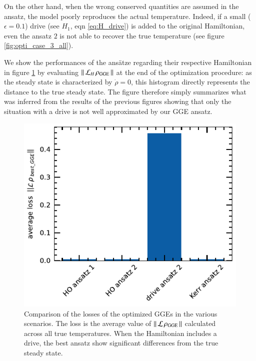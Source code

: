 On the other hand, when the wrong conserved quantities are assumed in the ansatz, the model poorly reproduces the actual temperature. 
Indeed, if a small ($\epsilon = 0.1$) drive (see $H_1$, eqn \ref{eq:H_drive}) is added to the original Hamiltonian, even the ansatz $2$ is not able to recover the true temperature (see figure \ref{fig:opti_case_3_all}).


We show the performances of the ansätze regarding their respective Hamiltonian in figure \ref{fig:comp_avg_loss} by evaluating $\vert\vert\, \mathcal{L}_H \, \rho_{\rm GGE} \,\vert\vert$ at the end of the optimization procedure: as the steady state is characterized by $\dot \rho = 0 $, this histogram directly represents the distance to the true steady state. The figure therefore simply summarizes what was inferred from the results of the previous figures showing that only the situation with a drive is not well approximated by our GGE ansatz.

\begin{figure}[h]
    \centering
    \includegraphics[scale=0.9]{figs/comp_avg_loss.pdf}
    \caption{Comparison of the losses of the optimized GGEs  in the various scenarios. The loss is the average value of $\vert\vert\, \mathcal{L} \, \rho_{\rm GGE} \,\vert\vert$ calculated across all true temperatures. When the Hamiltonian includes a drive, the best ansatz show significant differences from the true steady state.}
    \label{fig:comp_avg_loss}
\end{figure}




